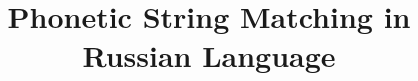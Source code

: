 \documentclass[conference,a4paper]{IEEEtran}
\begin{document}
\setmainfont{Times New Roman}

%
\date{}
\title{Phonetic String Matching in Russian Language}




%

\DeclareRobustCommand*{\IEEEauthorrefmark}[1]{\raisebox{0pt}[0pt][0pt]{\textsuperscript{\footnotesize #1}}}
\end{document}
